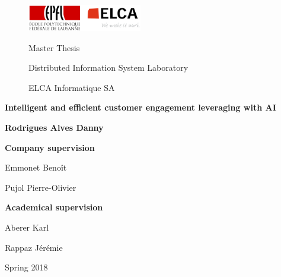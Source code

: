 \begin{titlepage}
	\centering
	
	\begin{figure}[!tbp]
            \centering
            \includegraphics[width=5cm]{images/epfl_elca_logos.png}
            \par
            \vspace{0.2cm}
            Master Thesis \par
            Distributed Information System Laboratory \par
            ELCA Informatique SA \par
            \vspace{3cm}
    \end{figure}
    
    \centering
	{\huge \textbf{Intelligent and efficient customer engagement leveraging with AI}\par}
    \vfill

    \begin{center}
        {\Large \textbf{Rodrigues Alves Danny}\par}
        \vspace{3cm}
        \textbf{Company supervision} \par
        Emmonet Benoît \par
        Pujol Pierre-Olivier \par
        \vspace{0.5cm}
        \textbf{Academical supervision} \par
        Aberer Karl  \par
        Rappaz Jérémie  \par
        \vfill
    \end{center}


	{\large Spring 2018\par}

\end{titlepage}